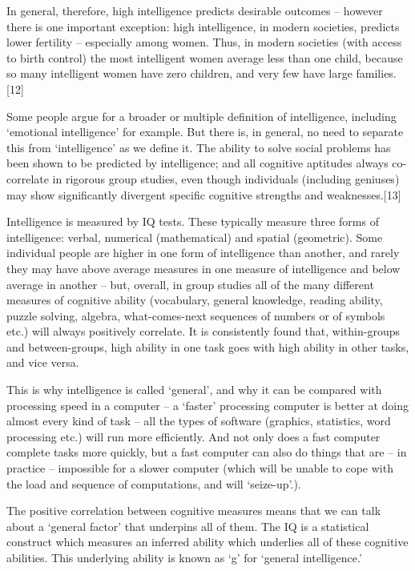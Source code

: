 \documentclass[
]{book}
\begin{document}
In general, therefore, high intelligence predicts desirable outcomes -- however there is one important exception: high intelligence, in modern societies, predicts lower fertility -- especially among women. Thus, in modern societies (with access to birth control) the most intelligent women average less than one child, because so many intelligent women have zero children, and very few have large families.{[}12{]}

Some people argue for a broader or multiple definition of intelligence, including `emotional intelligence' for example. But there is, in general, no need to separate this from `intelligence' as we define it. The ability to solve social problems has been shown to be predicted by intelligence; and all cognitive aptitudes always co-correlate in rigorous group studies, even though individuals (including geniuses) may show significantly divergent specific cognitive strengths and weaknesses.{[}13{]}

Intelligence is measured by IQ tests. These typically measure three forms of intelligence: verbal, numerical (mathematical) and spatial (geometric). Some individual people are higher in one form of intelligence than another, and rarely they may have above average measures in one measure of intelligence and below average in another -- but, overall, in group studies all of the many different measures of cognitive ability (vocabulary, general knowledge, reading ability, puzzle solving, algebra, what-comes-next sequences of numbers or of symbols etc.) will always positively correlate. It is consistently found that, within-groups and between-groups, high ability in one task goes with high ability in other tasks, and vice versa.

This is why intelligence is called `general', and why it can be compared with processing speed in a computer -- a `faster' processing computer is better at doing almost every kind of task -- all the types of software (graphics, statistics, word processing etc.) will run more efficiently. And not only does a fast computer complete tasks more quickly, but a fast computer can also do things that are -- in practice -- impossible for a slower computer (which will be unable to cope with the load and sequence of computations, and will `seize-up'.).

The positive correlation between cognitive measures means that we can talk about a `general factor' that underpins all of them. The IQ is a statistical construct which measures an inferred ability which underlies all of these cognitive abilities. This underlying ability is known as `g' for `general intelligence.'
\end{document}
